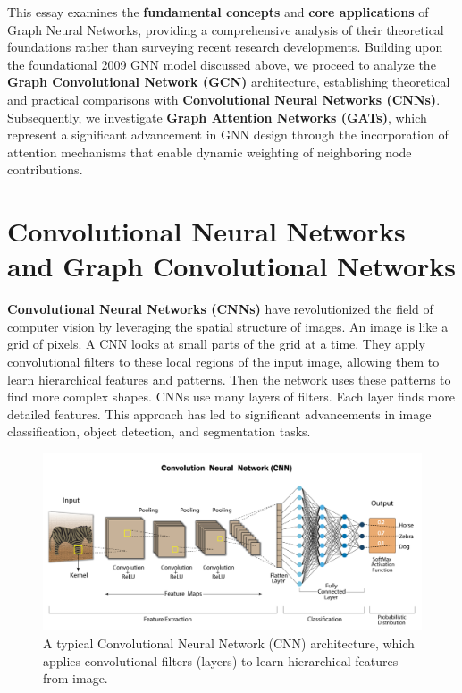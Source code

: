 \documentclass{article}
\begin{document}
This essay examines the \textbf{fundamental concepts} and \textbf{core applications} of Graph Neural Networks, providing a comprehensive analysis of their theoretical foundations rather than surveying recent research developments.
Building upon the foundational 2009 GNN model discussed above, we proceed to analyze the \textbf{Graph Convolutional Network (GCN)} architecture, establishing theoretical and practical comparisons with \textbf{Convolutional Neural Networks (CNNs)}. Subsequently, we investigate \textbf{Graph Attention Networks (GATs)}, which represent a significant advancement in GNN design through the incorporation of attention mechanisms that enable dynamic weighting of neighboring node contributions.

\section{Convolutional Neural Networks and Graph Convolutional Networks}

\textbf{Convolutional Neural Networks (CNNs)} \cite{krizhevsky2012imagenet} have revolutionized the field of computer vision by leveraging the spatial structure of images.
An image is like a grid of pixels. A CNN looks at small parts of the grid at a time.
They apply convolutional filters to these local regions of the input image, allowing them to learn hierarchical features and patterns.
Then the network uses these patterns to find more complex shapes. CNNs use many layers of filters. Each layer finds more detailed features.
This approach has led to significant advancements in image classification, object detection, and segmentation tasks.

\newpage

\begin{figure}[ht]
      \centering
      \includegraphics[width=1.0\textwidth]{../assets/cnn_architecture.png}
      \caption{A typical Convolutional Neural Network (CNN) architecture, which applies convolutional filters (layers) to learn hierarchical features from image.}
      \label{fig:cnn-architecture}
\end{figure}
\end{document}
